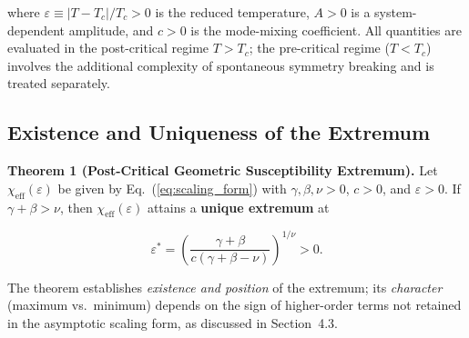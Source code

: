 \documentclass[aps,prl,twocolumn,superscriptaddress,byrevtex]{article}
\begin{document}
where $\varepsilon \equiv |T - T_c|/T_c > 0$ is the reduced temperature, $A > 0$ is a system-dependent amplitude, and $c > 0$ is the mode-mixing coefficient. All quantities are evaluated in the post-critical regime $T > T_c$; the pre-critical regime ($T < T_c$) involves the additional complexity of spontaneous symmetry breaking and is treated separately.

\subsection{Existence and Uniqueness of the Extremum}

\textbf{Theorem 1 (Post-Critical Geometric Susceptibility Extremum).}
Let $\chi_{\text{eff}}(\varepsilon)$ be given by Eq.~(\ref{eq:scaling_form}) with $\gamma, \beta, \nu > 0$, $c > 0$, and $\varepsilon > 0$. If $\gamma + \beta > \nu$, then $\chi_{\text{eff}}(\varepsilon)$ attains a \textbf{unique extremum} at

\begin{equation}
\varepsilon^* = \left(\frac{\gamma + \beta}{c(\gamma + \beta - \nu)}\right)^{1/\nu} > 0.
\label{eq:epsilon_star}
\end{equation}

The theorem establishes \emph{existence and position} of the extremum; its \emph{character} (maximum vs.\ minimum) depends on the sign of higher-order terms not retained in the asymptotic scaling form, as discussed in Section~4.3.
\end{document}
